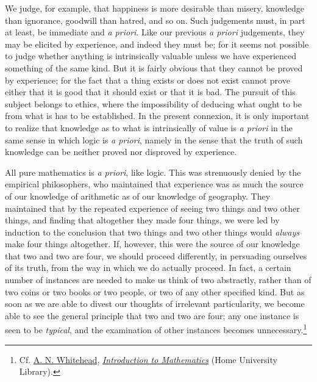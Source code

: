 \documentclass[oneside,letterpaper,12pt]{book}
\begin{document}
\label{thegood} We judge, for example, that happiness is more desirable than misery,
knowledge than ignorance, goodwill than hatred, and so on. Such
judgements must, in part at least, be immediate and \emph{a priori}.
Like our previous \emph{a priori} judgements, they may be elicited by
experience, and indeed they must be; for it seems not possible to judge
whether anything is intrinsically valuable unless we have experienced
something of the same kind. But it is fairly obvious that they cannot be
proved by experience; for the fact that a thing exists or does not exist
cannot prove either that it is good that it should exist or that it is
bad. The pursuit of this subject belongs to ethics, where the
impossibility of deducing what ought to be from what is has to be
established. In the present connexion, it is only important to realize
that knowledge as to what is intrinsically of value is \emph{a priori}
in the same sense in which logic is \emph{a priori}, namely in the sense
that the truth of such knowledge can be neither proved nor disproved by
experience.

\label{puremath} All pure mathematics is \emph{a priori}, like logic. This was
strenuously denied by the empirical philosophers, who maintained that
experience was as much the source of our knowledge of arithmetic as of
our knowledge of geography. They maintained that by the repeated
experience of seeing two things and two other things, and finding that
altogether they made four things, we were led by induction to the
conclusion that two things and two other things would \emph{always} make
four things altogether. If, however, this were the source of our
knowledge that two and two are four, we should proceed differently, in
persuading ourselves of its truth, from the way in which we do actually
proceed. In fact, a certain number of instances are needed to make us
think of two abstractly, rather than of two coins or two books or two
people, or two of any other specified kind. But as soon as we are able
to divest our thoughts of irrelevant particularity, we become able to
see the general principle that two and two are four; any one instance is
seen to be \emph{typical}, and the examination of other instances
becomes unnecessary.\footnote{Cf. 
	\href{https://plato.stanford.edu/entries/whitehead/}{A. N. Whitehead}, 
	\href{https://archive.org/details/introductiontoma00whitiala/mode/2up}
	{\emph{Introduction to Mathematics}} (Home University Library).}
\end{document}
